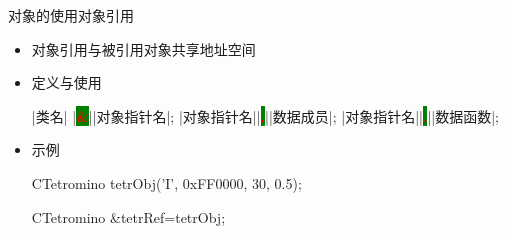 \begin{frame}[t, fragile]{对象的使用}{对象引用}%
  \begin{itemize}
  \item 对象引用与被引用对象共享地址空间
  \item 定义与使用\\
    \begin{center}
      \begin{minipage}{0.5\linewidth}
        \begin{cpptt}
|类名| |\colorbox{green}{\textcolor{red}{\textbf \&}}||对象指针名|;
|对象指针名||\colorbox{green}{\textcolor{red}{\textbf .}}||数据成员|;
|对象指针名||\colorbox{green}{\textcolor{red}{\textbf .}}||数据函数|;
        \end{cpptt}
      \end{minipage}
    \end{center}
  \item 示例
    \begin{center}
      \begin{minipage}{0.55\linewidth}
        \begin{cppcode}
CTetromino tetrObj('I', 0xFF0000, 30, 0.5);

CTetromino &tetrRef=tetrObj;
        \end{cppcode}
      \end{minipage}
    \end{center}
  \end{itemize}
\end{frame}

